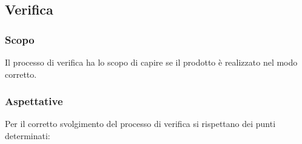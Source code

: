 \subsection{Verifica}

    \subsubsection{Scopo}
    
    Il processo di verifica ha lo scopo di capire se il prodotto è realizzato nel modo corretto.
    
    \subsubsection{Aspettative}
    
    Per il corretto svolgimento del processo di verifica si rispettano dei punti determinati:
    
